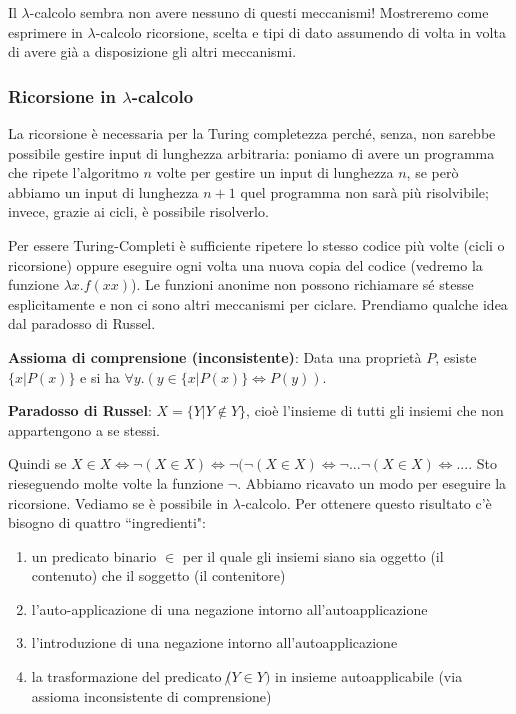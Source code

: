 \documentclass{article}
\begin{document}
Il $\lambda$-calcolo sembra non avere nessuno di questi meccanismi! Mostreremo come esprimere in $\lambda$-calcolo ricorsione, scelta e tipi di dato assumendo di volta in volta di avere già a disposizione gli altri meccanismi.

\subsubsection{Ricorsione in $\lambda$-calcolo}
La ricorsione è necessaria per la Turing completezza perché, senza, non sarebbe possibile gestire input di lunghezza arbitraria: poniamo di avere un programma che ripete l'algoritmo $n$ volte per gestire un input di lunghezza $n$, se però abbiamo un input di lunghezza $n+1$ quel programma non sarà più risolvibile; invece, grazie ai cicli, è possibile risolverlo.

\bigskip

Per essere Turing-Completi è sufficiente ripetere lo stesso codice più volte (cicli o ricorsione) oppure eseguire ogni volta una nuova copia del codice (vedremo la funzione $\lambda x.f(xx)$). Le funzioni anonime non possono richiamare sé stesse esplicitamente e non ci sono altri meccanismi per ciclare. Prendiamo qualche idea dal paradosso di Russel.

\bigskip

\noindent\textbf{Assioma di comprensione (inconsistente)}: Data una proprietà $P$, esiste $\{x|P(x)\}$ e si ha $\forall y.(y\in \{x|P(x)\} \iff P(y))$.

\bigskip

\noindent \textbf{Paradosso di Russel}: $X = \{Y | Y \not \in Y\}$, cioè l'insieme di tutti gli insiemi che non appartengono a se stessi.

\bigskip

\noindent Quindi se $X \in X \iff \lnot (X\in X) \iff \lnot(\lnot(X\in X) \iff \lnot ... \lnot (X\in X) \iff ... $. Sto rieseguendo molte volte la funzione $\lnot$. Abbiamo ricavato un modo per eseguire la ricorsione. Vediamo se è possibile in $\lambda$-calcolo. Per ottenere questo risultato c'è bisogno di quattro ``ingredienti":
\begin{enumerate}
    \item un predicato binario $\in$ per il quale gli insiemi siano sia oggetto (il contenuto) che il soggetto (il contenitore)
    \item l'auto-applicazione di una negazione intorno all'autoapplicazione
    \item l'introduzione di una negazione intorno all'autoapplicazione
    \item la trasformazione del predicato $\not(Y\in Y)$ in insieme autoapplicabile (via assioma inconsistente di comprensione)
\end{enumerate}
\end{document}
